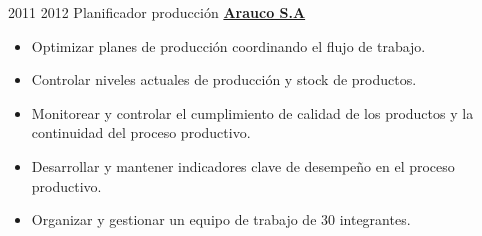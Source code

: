 \documentclass[letterpaper]{DS_class_file} %
\begin{document}
\begin{twenty}
	\twentyitem
	{2011}
	{2012}
	{\hspace{0.3cm}Planificador producción}
	{\href{https://www.arauco.cl/chile/}{\textbf{Arauco S.A}}}
	{}
	{\begin{itemize}
			\item Optimizar planes de producción coordinando el flujo de trabajo.
			\item Controlar niveles actuales de producción y stock de productos.
			\item Monitorear y controlar el cumplimiento de calidad de los productos y la continuidad del proceso productivo.
			\item Desarrollar y mantener indicadores clave de desempeño en el proceso productivo.
			\item Organizar y gestionar un equipo de trabajo de 30 integrantes.
	\end{itemize}}
\end{twenty}
\end{document}
